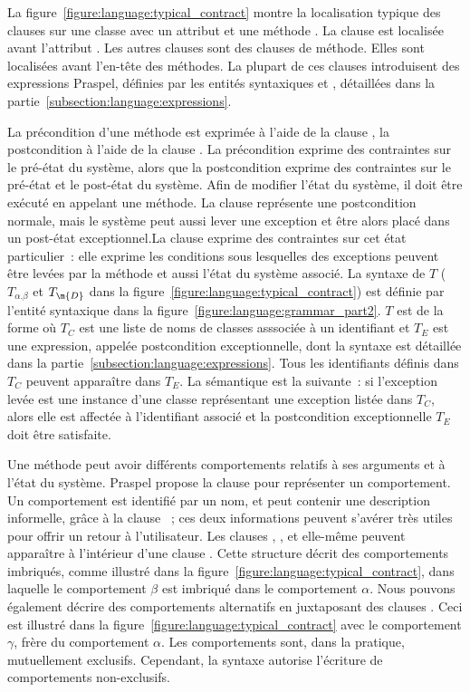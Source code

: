 La figure~\ref{figure:language:typical_contract} montre la localisation typique
des clauses sur une classe  avec un attribut  et une méthode
. La clause \ainvariant est localisée avant l'attribut .  Les
autres clauses sont des clauses de méthode. Elles sont localisées avant
l'en-tête des méthodes. La plupart de ces clauses introduisent des expressions
Praspel, définies par les entités syntaxiques  et
, détaillées dans la
partie~\ref{subsection:language:expressions}.

La précondition d'une méthode est exprimée à l'aide de la clause \arequires, la
postcondition à l'aide de la clause \aensures. La précondition exprime des
contraintes sur le {\strong pré-état} du système, alors que la postcondition
exprime des contraintes sur le pré-état et le {\strong post-état} du système.
Afin de modifier l'état du système, il doit être exécuté en appelant une
méthode. \pagebreak La clause \aensures représente une {\strong postcondition
normale}, mais le système peut aussi lever une exception et être alors placé
dans un {\strong post-état exceptionnel}.La clause \athrowable exprime des
contraintes sur cet état particulier~: elle exprime les conditions sous
lesquelles des exceptions peuvent être levées par la méthode et aussi l'état du
système associé. La syntaxe de $T$ ($T_{\alpha.\beta}$ et $T_\m{D}$ dans la
figure~\ref{figure:language:typical_contract}) est définie par l'entité
syntaxique  dans la
figure~\ref{figure:language:grammar_part2}. $T$ est de la forme  où $T_C$ est une liste de noms de classes asssociée à un identifiant et
$T_E$ est une expression, appelée {\strong postcondition exceptionnelle}, dont
la syntaxe est détaillée dans la partie~\ref{subsection:language:expressions}.
Tous les identifiants définis dans $T_C$ peuvent apparaître dans $T_E$. La
sémantique est la suivante~: si l'exception levée est une instance d'une classe
représentant une exception listée dans $T_C$, alors elle est affectée à
l'identifiant associé et la postcondition exceptionnelle $T_E$ doit être
satisfaite.

Une méthode peut avoir différents {\strong comportements} relatifs à ses
arguments et à l'état du système. Praspel propose la clause \abehavior pour
représenter un comportement. Un comportement est identifié par un nom, et peut
contenir une description informelle, grâce à la clause \adescription~; ces deux
informations peuvent s'avérer très utiles pour offrir un retour à l'utilisateur.
Les clauses \arequires, \aensures, \athrowable et \abehavior elle-même peuvent
apparaître à l'intérieur d'une clause \abehavior. Cette structure décrit des
comportements {\strong imbriqués}, comme illustré dans la
figure~\ref{figure:language:typical_contract}, dans laquelle le comportement
$\beta$ est imbriqué dans le comportement $\alpha$. Nous pouvons également
décrire des comportements {\strong alternatifs} en juxtaposant des clauses
\abehavior. Ceci est illustré dans la
figure~\ref{figure:language:typical_contract} avec le comportement $\gamma$,
frère du comportement $\alpha$. Les comportements sont, dans la pratique,
{\strong mutuellement exclusifs}. Cependant, la syntaxe autorise l'écriture de
comportements non-exclusifs.

